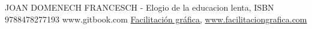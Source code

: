 \begin{thebibliography}{X}
  JOAN DOMENECH FRANCESCH - Elogio de la educacion lenta, ISBN 9788478277193
  www.gitbook.com 
   \href{www.facilitaciongrafica.com}{Facilitaci\'on gr\'afica,} \url{www.facilitaciongrafica.com} 
\end{thebibliography}